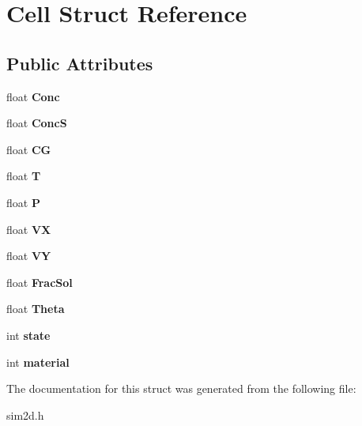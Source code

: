 \hypertarget{struct_cell}{}\section{Cell Struct Reference}
\label{struct_cell}
\subsection*{Public Attributes}
\begin{DoxyCompactItemize}
\item 
\hypertarget{struct_cell_accf36fdf5633916de4552b2723af7b55}{}float {\bfseries Conc}\label{struct_cell_accf36fdf5633916de4552b2723af7b55}

\item 
\hypertarget{struct_cell_a528d61f59afd3069f624e859920eede2}{}float {\bfseries Conc\+S}\label{struct_cell_a528d61f59afd3069f624e859920eede2}

\item 
\hypertarget{struct_cell_af7816066da1cdc45ac9f86c8fded4313}{}float {\bfseries C\+G}\label{struct_cell_af7816066da1cdc45ac9f86c8fded4313}

\item 
\hypertarget{struct_cell_ab894c4e134ad0e39341f7e114d99e8d5}{}float {\bfseries T}\label{struct_cell_ab894c4e134ad0e39341f7e114d99e8d5}

\item 
\hypertarget{struct_cell_af8b1dec50be52f41a73dcb540eee995f}{}float {\bfseries P}\label{struct_cell_af8b1dec50be52f41a73dcb540eee995f}

\item 
\hypertarget{struct_cell_a96b71bcd368e0946442db9c2d2660d83}{}float {\bfseries V\+X}\label{struct_cell_a96b71bcd368e0946442db9c2d2660d83}

\item 
\hypertarget{struct_cell_a8f1075d5c7b78714fd20fadcd4c8bd9f}{}float {\bfseries V\+Y}\label{struct_cell_a8f1075d5c7b78714fd20fadcd4c8bd9f}

\item 
\hypertarget{struct_cell_a0dd7fcb8960beebe1a280d59c822f4e1}{}float {\bfseries Frac\+Sol}\label{struct_cell_a0dd7fcb8960beebe1a280d59c822f4e1}

\item 
\hypertarget{struct_cell_a7afe9cd5e5302296e859f0613b552bd1}{}float {\bfseries Theta}\label{struct_cell_a7afe9cd5e5302296e859f0613b552bd1}

\item 
\hypertarget{struct_cell_a8ae133c91e051d0ba90cae10fa0297f7}{}int {\bfseries state}\label{struct_cell_a8ae133c91e051d0ba90cae10fa0297f7}

\item 
\hypertarget{struct_cell_a0e0934c5a4014f6af31d82815c29d388}{}int {\bfseries material}\label{struct_cell_a0e0934c5a4014f6af31d82815c29d388}

\end{DoxyCompactItemize}


The documentation for this struct was generated from the following file\+:\begin{DoxyCompactItemize}
\item 
sim2d.\+h\end{DoxyCompactItemize}
